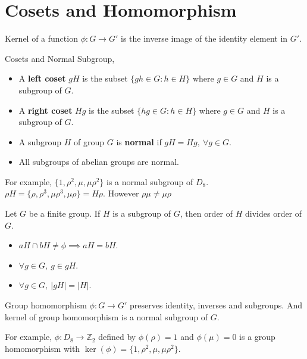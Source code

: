 \section{Cosets and Homomorphism}
\begin{definition}
	Kernel of a function $\phi : G \to G'$ is the inverse image of the identity element in $G'$. %
\end{definition}

\begin{definition}Cosets and Normal Subgroup,
	\begin{itemize}
		\item A \textbf{left coset} $gH$ is the subset $\{ gh \in G : h \in H \}$ where $g \in G$ and  $H$ is a subgroup of $G$.%
		\item A \textbf{right coset} $Hg$ is the subset $\{ hg \in G : h \in H \}$ where $g \in G$ and  $H$ is a subgroup of $G$.%
		\item A subgroup $H$ of group $G$ is \textbf{normal} if $gH = Hg,\ \forall g \in G$.
		\item All subgroups of abelian groups are normal.
	\end{itemize}
\end{definition}

\begin{remark}
	For example, $\{1,\rho^2,\mu,\mu\rho^2\}$ is a normal subgroup of $D_8$.\\
	$\rho H = \{ \rho, \rho^3, \mu\rho^3, \mu\rho \} = H\rho$. However $\rho\mu \ne \mu\rho$
\end{remark}
\begin{remark}%
	Let $G$ be a finite group. If $H$ is a subgroup of $G$, then order of $H$ divides order of $G$.
\end{remark}
\begin{itemize}
	\item $aH \cap bH \ne \phi \implies aH = bH$.
	\item $\forall g \in G,\ g \in gH$.
	\item $\forall g \in G,\ |gH| = |H|$.
\end{itemize}

\begin{remark}
	Group homomorphism $\phi : G \to G'$ preserves identity, inverses and subgroups. And kernel of group homomorphism is a normal subgroup of $G$.%
\end{remark}
\begin{remark}
	For example, $\phi : D_8 \to \mathbb{Z}_2$ defined by $\phi(\rho) = 1$ and $\phi(\mu) = 0$ is a group homomorphism with $\ker(\phi) = \{ 1,\rho^2,\mu,\mu\rho^2 \}$.
\end{remark}
\pagebreak

